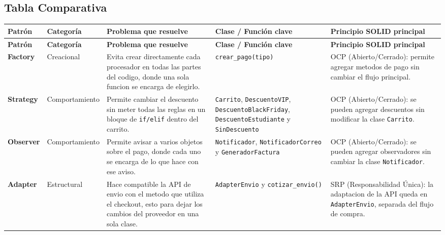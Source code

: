 \documentclass[letterpaper,11pt]{article}
\begin{document}


\subsection*{Tabla Comparativa}


\begingroup
\footnotesize
\setlength{\tabcolsep}{4pt}
\renewcommand{\arraystretch}{1.25}
\begin{longtable}{|>{\raggedright\arraybackslash}p{}|>{\raggedright\arraybackslash}p{}|>{\raggedright\arraybackslash}p{}|>{\raggedright\arraybackslash}p{}|>{\raggedright\arraybackslash}p{}|}
\hline
\rowcolor{black!8}
\textbf{Patrón} & \textbf{Categoría} & \textbf{Problema que resuelve} & \textbf{Clase / Función clave} & \textbf{Principio SOLID principal} \\ \hline
\endfirsthead
\hline
\rowcolor{black!8}
\textbf{Patrón} & \textbf{Categoría} & \textbf{Problema que resuelve} & \textbf{Clase / Función clave} & \textbf{Principio SOLID principal} \\ \hline
\endhead
\textbf{Factory} & Creacional & Evita crear directamente cada procesador en todas las partes del codigo, donde una sola funcion se encarga de elegirlo. & \texttt{crear\_pago(tipo)} & OCP (Abierto/Cerrado): permite agregar metodos de pago sin cambiar el flujo principal. \\ \hline
\textbf{Strategy} & Comportamiento & Permite cambiar el descuento sin meter todas las reglas en un bloque de \texttt{if/elif} dentro del carrito. & \texttt{Carrito}, \texttt{DescuentoVIP}, \texttt{DescuentoBlackFriday}, \texttt{DescuentoEstudiante} y \texttt{SinDescuento} & OCP (Abierto/Cerrado): se pueden agregar descuentos sin modificar la clase \texttt{Carrito}. \\ \hline
\textbf{Observer} & Comportamiento & Permite avisar a varios objetos sobre el pago, donde cada uno se encarga de lo que hace con ese aviso. & \texttt{Notificador}, \texttt{NotificadorCorreo} y \texttt{GeneradorFactura} & OCP (Abierto/Cerrado): se pueden agregar observadores sin cambiar la clase \texttt{Notificador}. \\ \hline
\textbf{Adapter} & Estructural & Hace compatible la API de envio con el metodo que utiliza el checkout, esto para dejar los cambios del proveedor en una sola clase. & \texttt{AdapterEnvio} y \texttt{cotizar\_envio()} & SRP (Responsabilidad Única): la adaptacion de la API queda en \texttt{AdapterEnvio}, separada del flujo de compra. \\ \hline
\end{longtable}
\endgroup
\end{document}
